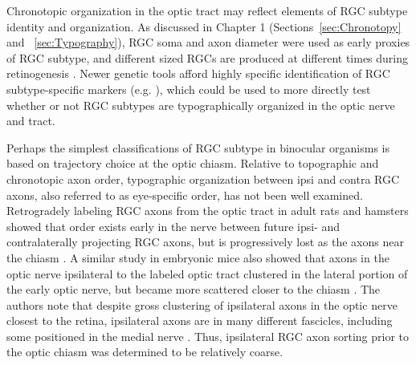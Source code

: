 Chronotopic organization in the optic tract may reflect elements of RGC subtype identity and organization.
As discussed in Chapter 1 (Sections~\ref{sec:Chronotopy} and ~\ref{sec:Typography}), RGC soma and axon diameter were used as early proxies of RGC subtype, and different sized RGCs are produced at different times during retinogenesis \cite{rapaport1995spatiotemporal,reese1994birthdates}.
Newer genetic tools afford highly specific identification of RGC subtype-specific markers (e.g. ), which could be used to more directly test whether or not RGC subtypes are typographically organized in the optic nerve and tract.

Perhaps the simplest classifications of RGC subtype in binocular organisms is based on trajectory choice at the optic chiasm.
Relative to topographic and chronotopic axon order, typographic organization between ipsi and contra RGC axons, also referred to as eye-specific order, has not been well examined.
Retrogradely labeling RGC axons from the optic tract in adult rats and hamsters showed that order exists early in the nerve between future ipsi- and contralaterally projecting RGC axons, but is progressively lost as the axons near the chiasm \cite{baker1989distribution}.
A similar study in embryonic mice also showed that axons in the optic nerve ipsilateral to the labeled optic tract clustered in the lateral portion of the early optic nerve, but became more scattered closer to the chiasm \cite{colello1990early}.
The authors note that despite gross clustering of ipsilateral axons in the optic nerve closest to the retina, ipsilateral axons are in many different fascicles, including some positioned in the medial nerve \cite{colello1990early}.
Thus, ipsilateral RGC axon sorting prior to the optic chiasm was determined to be relatively coarse.


